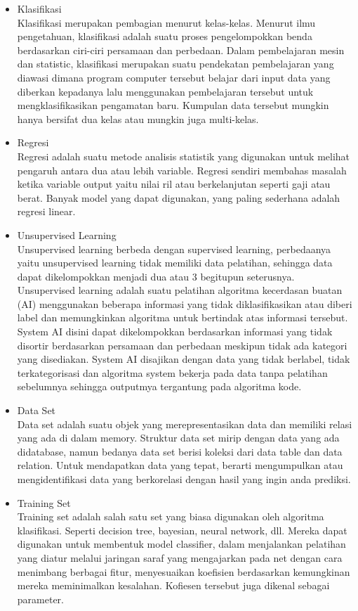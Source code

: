 \begin{enumerate}
\begin{itemize}
\item Klasifikasi\\
Klasifikasi merupakan pembagian menurut kelas-kelas. Menurut ilmu pengetahuan, klasifikasi adalah suatu proses pengelompokkan benda berdasarkan ciri-ciri persamaan dan perbedaan. Dalam pembelajaran mesin dan statistic, klasifikasi merupakan suatu pendekatan pembelajaran yang diawasi dimana program computer tersebut belajar dari input data yang diberkan kepadanya lalu menggunakan pembelajaran tersebut untuk mengklasifikasikan pengamatan baru. Kumpulan data tersebut mungkin hanya bersifat dua kelas atau mungkin juga multi-kelas.

\item Regresi\\
Regresi adalah suatu metode analisis statistik yang digunakan untuk melihat pengaruh antara dua atau lebih variable. Regresi sendiri membahas masalah ketika variable output yaitu nilai ril atau berkelanjutan seperti gaji atau berat. Banyak model yang dapat digunakan, yang paling sederhana adalah regresi linear.

\item Unsupervised Learning\\
Unsupervised learning berbeda dengan supervised learning, perbedaanya yaitu unsupervised learning tidak memiliki data pelatihan, sehingga data dapat dikelompokkan menjadi dua atau 3 begitupun seterusnya. Unsupervised learning adalah suatu pelatihan algoritma kecerdasan buatan (AI) menggunakan beberapa informasi yang tidak diklasifikasikan atau diberi label dan memungkinkan algoritma  untuk bertindak atas informasi tersebut. System AI disini dapat dikelompokkan berdasarkan informasi yang tidak disortir berdasarkan persamaan dan perbedaan meskipun tidak ada kategori yang disediakan. System AI disajikan dengan data yang tidak berlabel, tidak terkategorisasi dan algoritma system bekerja pada data tanpa pelatihan sebelumnya sehingga outputmya tergantung pada algoritma kode.

\item Data Set\\
Data set adalah suatu objek yang merepresentasikan data dan memiliki relasi yang ada di dalam memory. Struktur data set mirip dengan data yang ada didatabase, namun bedanya data set berisi koleksi dari data table dan data relation. Untuk mendapatkan data yang tepat, berarti mengumpulkan atau mengidentifikasi data yang berkorelasi dengan hasil yang ingin anda prediksi.

\item Training Set\\
Training set adalah salah satu set yang biasa digunakan oleh algoritma klasifikasi. Seperti decision tree, bayesian, neural network, dll. Mereka dapat digunakan untuk membentuk model classifier, dalam menjalankan pelatihan yang diatur melalui jaringan saraf yang mengajarkan pada net dengan cara menimbang berbagai fitur, menyesuaikan koefisien berdasarkan kemungkinan mereka meminimalkan kesalahan. Kofiesen tersebut juga dikenal sebagai parameter.


\end{itemize}
\end{enumerate}
